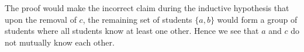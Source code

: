 \documentclass{article}
\begin{document}
\begin{solution}
The proof would make the incorrect claim during the inductive hypothesis that upon the removal of $c$, the remaining 
set of students $\{a, b\}$ would form a group of students where all students know at least one other. 
Hence we see that $a$ and $c$ do not mutually know each other.

\end{solution}
\end{document}

